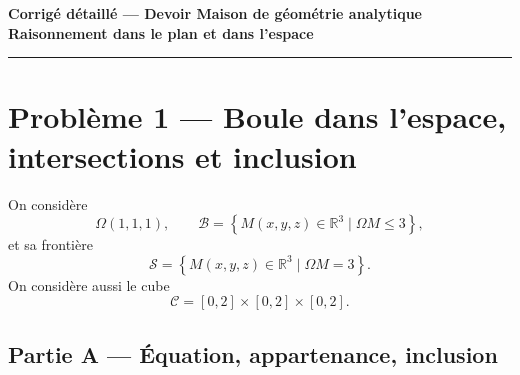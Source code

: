 \documentclass[11pt,a4paper]{article}
\newcommand{\R}{\mathbb{R}}
\newcommand{\Boule}{\mathcal{B}}
\newcommand{\Sphere}{\mathcal{S}}
\newcommand{\Cube}{\mathcal{C}}
\begin{document}
\begin{center}
    {\Large \textbf{Corrigé détaillé --- Devoir Maison de géométrie analytique}}\\[0.4em]
    {\large \textbf{Raisonnement dans le plan et dans l'espace}}\\[0.8em]
    \rule{0.75\textwidth}{0.6pt}
\end{center}

\vspace{0.8em}

\section*{Problème 1 --- Boule dans l'espace, intersections et inclusion}

On considère
\[
\Omega(1,1,1),\qquad 
\Boule=\left\{M(x,y,z)\in\R^3\mid \Omega M\le 3\right\},
\]
et sa frontière
\[
\Sphere=\left\{M(x,y,z)\in\R^3\mid \Omega M=3\right\}.
\]
On considère aussi le cube
\[
\Cube=[0,2]\times[0,2]\times[0,2].
\]

\subsection*{Partie A --- Équation, appartenance, inclusion}
\end{document}

